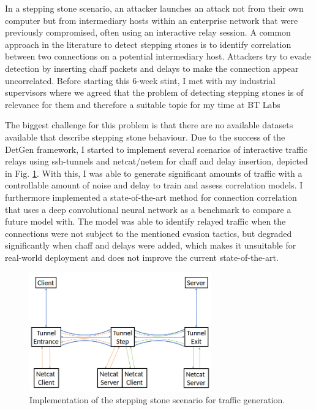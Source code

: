 \documentclass[a4paper,12pt,twoside]{article}
\begin{document}
In a stepping stone scenario, an attacker launches an attack not from their own computer but from intermediary hosts within an enterprise network that were previously compromised, often using an interactive relay session. A common approach in the literature to detect stepping stones is to identify correlation between two connections on a potential intermediary host. Attackers try to evade detection by inserting chaff packets and delays to make the connection appear uncorrelated. Before starting this 6-week stint, I met with my industrial supervisors where we agreed that the problem of detecting stepping stones is of relevance for them and therefore a suitable topic for my time at BT Labs

The biggest challenge for this problem is that there are no available datasets available that describe stepping stone behaviour. Due to the success of the  DetGen framework, I started to implement several scenarios of interactive traffic relays using ssh-tunnels and netcat/netem for chaff and delay insertion, depicted in Fig. \ref{stepstone}. With this, I was able to generate significant amounts of traffic with a controllable amount of noise and delay to train and assess correlation models. 
I furthermore implemented a state-of-the-art method for connection correlation \cite{nasr2018deepcorr} that uses a deep convolutional neural network as a benchmark to compare a future model with. The model was able to identify relayed traffic when the connections were not subject to the mentioned evasion tactics, but degraded significantly when chaff and delays were added, which makes it unsuitable for real-world deployment and does not improve the current state-of-the-art. 


\begin{figure}
\centering
\includegraphics[width=0.7\textwidth]{images/Step_stones.png}
\caption{Implementation of the stepping stone scenario for traffic generation.}\label{stepstone}
\end{figure}
\end{document}
